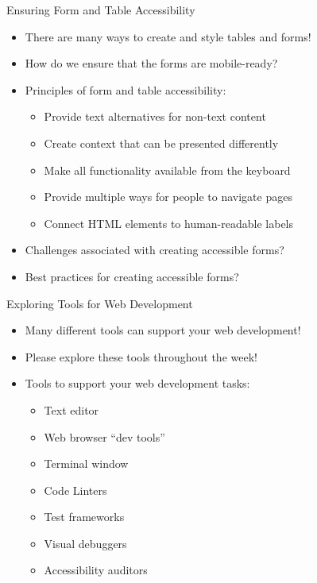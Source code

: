 \documentclass[14pt,aspectratio=169]{beamer}
\begin{document}
%
\begin{frame}{Ensuring Form and Table Accessibility}
  \begin{itemize}
    \item There are many ways to create and style tables and forms!
      \vspace*{-.2in}
    \item How do we ensure that the forms are mobile-ready?
      \vspace*{-.2in}
    \item Principles of form and table accessibility:
      \begin{itemize}
        \item Provide text alternatives for non-text content
        \item Create context that can be presented differently
        \item Make all functionality available from the keyboard
        \item Provide multiple ways for people to navigate pages
        \item Connect HTML elements to human-readable labels
      \end{itemize}
      \vspace*{-.25in}
    \item Challenges associated with creating accessible forms?
      \vspace*{-.25in}
    \item Best practices for creating accessible forms?
  \end{itemize}
\end{frame}

%
\begin{frame}{Exploring Tools for Web Development}
%
  \begin{itemize}
    \item Many different tools can support your web development!
      \vspace*{-.2in}
    \item Please explore these tools throughout the week!
      \vspace*{-.15in}
    \item Tools to support your web development tasks:
      \begin{itemize}
        \item Text editor
        \item Web browser ``dev tools''
        \item Terminal window
        \item Code Linters
        \item Test frameworks
        \item Visual debuggers
        \item Accessibility auditors
      \end{itemize}
  \end{itemize}
%
\end{frame}
\end{document}
